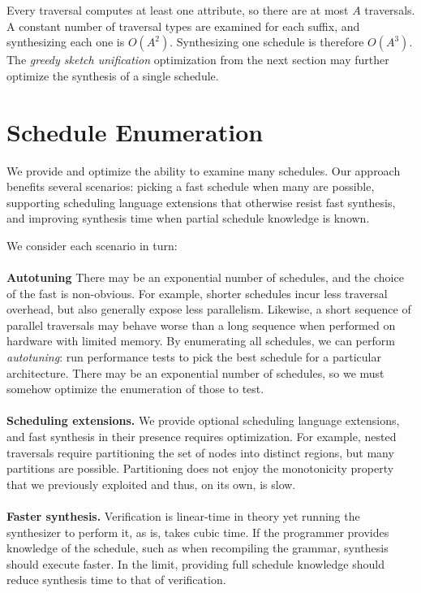 \noindent Every traversal computes at least one attribute, so there are at most $A$ traversals. A constant number of traversal types are examined for each suffix, and synthesizing each one is $O(A^2)$. Synthesizing one schedule is therefore $O(A^3)$.  The \emph{greedy sketch unification} optimization from the next section may further optimize the synthesis of a single schedule.


\section{Schedule Enumeration}
We provide and optimize the ability to examine many schedules. Our approach benefits several scenarios: picking a fast schedule when many are possible, supporting scheduling language extensions that otherwise resist fast synthesis, and improving synthesis time when partial schedule knowledge is known.

We consider each scenario in turn:

\paragraph{}
\textbf{Autotuning} There may be an exponential number of schedules, and the choice of the fast is non-obvious. For example, shorter schedules incur less traversal overhead, but also generally expose less parallelism. Likewise, a short sequence of parallel traversals may behave worse than a long sequence when performed on hardware with limited memory. By enumerating all schedules, we can perform \emph{autotuning}: run performance tests to pick the best schedule for a particular architecture. There may be an exponential number of schedules, so we must somehow optimize the enumeration of those to test.

\paragraph{}
 \textbf{Scheduling extensions.} We provide optional scheduling language extensions, and fast synthesis in their presence requires optimization. For example, nested traversals require partitioning the set of nodes into distinct regions, but many partitions are possible. Partitioning does not enjoy the monotonicity property that we previously exploited and thus, on its own, is slow.

\paragraph{}
 \textbf{Faster synthesis.} Verification is linear-time in theory yet running the synthesizer to perform it, as is, takes cubic time.  If the programmer provides knowledge of the schedule, such as when recompiling the grammar, synthesis should execute faster. In the limit, providing full schedule knowledge should reduce synthesis time to that of verification.

